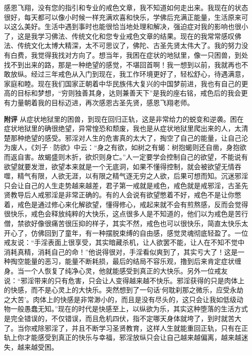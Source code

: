 \begin{case}
    感恩飞翔，没有您的指引和专业的戒色文章，我不知道如何走出来。我现在的状态很好，每天都可以像小时候一样充满欢喜和快乐，学佛后充满正能量，生活原来可以这么美好。生活中遇到事时也能很恰当地处理和解决，强迫症对我的影响也很小了，这是我学习佛法、传统文化和您专业戒色文章的结果。现在的我常常感叹佛法、传统文化太博大精深，太不可思议了，佛陀、古圣先贤太伟大了。我的努力没有白费，我觉得我找对方向了。想当年，我困在症状的地狱里，像一只困兽，到处找不到出来的路，那是一种绝望的感觉，不堪回首啊！我一想到以前，我就再也不敢放纵。经过三年戒色从入门到现在，我工作环境更好了，轻松舒心，待遇满意，家庭和睦。现在我们国家正朝着中华民族伟大复兴的中国梦前进，我也有自己的更高的目标和梦想，“穷则独善其身，达则兼善天下”是我的座右铭，戒色后的我会更有力量朝着我的目标迈进，再次感恩古圣先贤，感恩飞翔老师。

    \textbf{附评} 从症状地狱里的困兽，到现在回归正轨，这是非常给力的蜕变和逆袭。困在症状地狱里的确很绝望，异常惶恐和颓废，我也是从症状地狱里爬出来的人，太清楚那种绝望的感受。邪淫对人生的危害真的太大了，掏空了自己的能量，让自己沦为废人，《刘子·防欲》中云：“身之有欲，如树之有蝎：树抱蝎则还自凿，身抱欲而返自害。故蝎盛则木折，欲炽则身亡。”人一定要学会控制自己的欲望，不能说有欲望就要发泄，欲望本来就是一个无底洞，如果不懂得控制，就会被欲望无情吞噬，精气有限，人欲无涯，以有限之精气逐无穷之人欲，后果可想而知。沉迷邪淫只会让自己的人生走势越来越差，君子第一戒就是戒色，戒色就是戒邪淫，古圣先贤教导后人戒邪淫是非常正确的。有的人会说有欲望憋着不好，戒色不是让你憋着，戒色是通过修心来化解欲望，懂得修心，戒起来就不会有煎熬感，反而会觉得很快乐，戒色会释放纯粹的大快乐，这点很多人是不知道的，他们以为戒色是苦行僧，禁欲好像很痛苦很压抑的样子，其实不然，戒色也可以很快乐，简直太快乐太开心了，仿佛回到了童年，有一种摆脱束缚的自由感，感觉灵魂彻底轻盈了。一位戒友说：“手淫表面上很享受，其实暗藏杀机，让人欲罢不能，让人在不知不觉中消耗真精，消耗自己的命！”他说得很对，手淫看似爽到了，其实亏大了！这是一种掏空能量的恶习，能量不断耗损，最后的结局不容乐观，撸到后来肯定症状缠身。当一个人恢复了纯净心灵，他就能感受到真正的大快乐。另外一位戒友说：“邪淫带来的只有危害，只会让人变得越来越不快乐。邪淫获得的只是肉体上的快感，而不是心灵上的大快乐。突然想到了一句话‘何耽刹那之微乐，应受永劫之大苦’。肉体上的快感是非常渺小的，而且是没有尽头的，这只会让我如低级动物一般愚蠢无知。”现在的时代是快感至上，以纵欲为乐，其实这种堕落的生活方式是完全错误的，不仅错误，而且危机四伏，指不定哪天身体就垮了，到时就苦大了。当你戒除邪淫了，并且不断学习圣贤教育，这样人生就能重回正轨，只有在正轨上你才能感受到真正的快乐与幸福，邪淫放纵只会让自己越来越偏离，越来越迷失，越来越受困。
\end{case}

